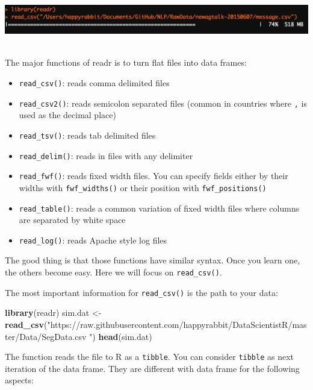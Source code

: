 \documentclass[12pt,]{krantz}
\makeatletter
\newenvironment{Shaded}{\begin{snugshade}}{\end{snugshade}}
\newcommand{\KeywordTok}[1]{\textcolor[rgb]{0.27,0.27,0.27}{\textbf{#1}}}
\newcommand{\StringTok}[1]{\textcolor[rgb]{0.5,0.5,0.5}{#1}}
\newcommand{\NormalTok}[1]{#1}
\providecommand{\tightlist}{%
  \setlength{\itemsep}{0pt}\setlength{\parskip}{0pt}}
\newenvironment{kframe}{%
\medskip{}
\setlength{\fboxsep}{.8em}
 \def\at@end@of@kframe{}%
 \ifinner\ifhmode%
  \def\at@end@of@kframe{\end{minipage}}%
  \begin{minipage}{\columnwidth}%
 \fi\fi%
 \def\FrameCommand##1{\hskip\@totalleftmargin \hskip-\fboxsep
 \colorbox{shadecolor}{##1}\hskip-\fboxsep
     \hskip-\linewidth \hskip-\@totalleftmargin \hskip\columnwidth}%
 \MakeFramed {\advance\hsize-\width
   \@totalleftmargin\z@ \linewidth\hsize
   \@setminipage}}%
 {\par\unskip\endMakeFramed%
 \at@end@of@kframe}
\renewenvironment{Shaded}{\begin{kframe}}{\end{kframe}}
\theoremstyle{definition}
\theoremstyle{definition}
\theoremstyle{definition}
\theoremstyle{remark}
\makeatother
\begin{document}
\includegraphics{images/prograssbar.png}~

The major functions of readr is to turn flat files into data frames:

\begin{itemize}
\tightlist
\item
  \texttt{read\_csv()}: reads comma delimited files
\item
  \texttt{read\_csv2()}: reads semicolon separated files (common in
  countries where \texttt{,} is used as the decimal place)
\item
  \texttt{read\_tsv()}: reads tab delimited files
\item
  \texttt{read\_delim()}: reads in files with any delimiter
\item
  \texttt{read\_fwf()}: reads fixed width files. You can specify fields
  either by their widths with \texttt{fwf\_widths()} or their position
  with \texttt{fwf\_positions()}\\
\item
  \texttt{read\_table()}: reads a common variation of fixed width files
  where columns are separated by white space
\item
  \texttt{read\_log()}: reads Apache style log files
\end{itemize}

The good thing is that those functions have similar syntax. Once you
learn one, the others become easy. Here we will focus on
\texttt{read\_csv()}.

The most important information for \texttt{read\_csv()} is the path to
your data:

\begin{Shaded}
\begin{Highlighting}[]
\KeywordTok{library}\NormalTok{(readr)}
\NormalTok{sim.dat <-}\StringTok{ }\KeywordTok{read_csv}\NormalTok{(}\StringTok{"https://raw.githubusercontent.com/happyrabbit/DataScientistR/master/Data/SegData.csv "}\NormalTok{)}
\KeywordTok{head}\NormalTok{(sim.dat)}
\end{Highlighting}
\end{Shaded}

The function reads the file to R as a \texttt{tibble}. You can consider
\texttt{tibble} as next iteration of the data frame. They are different
with data frame for the following aspects:
\end{document}
